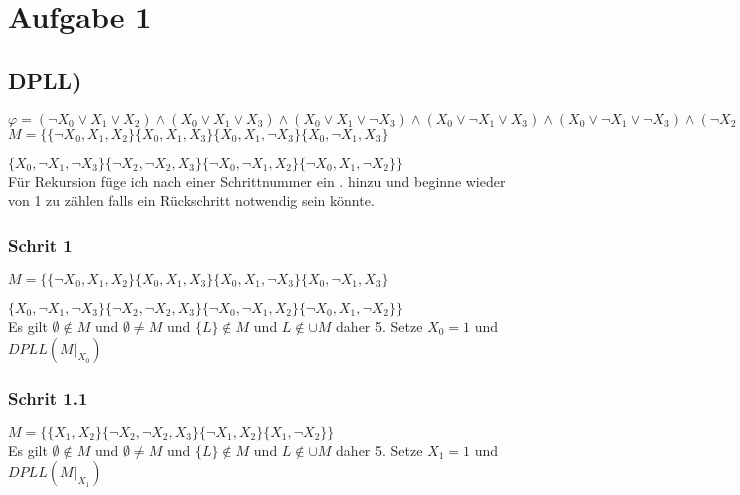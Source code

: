 \section*{Aufgabe 1}

\subsection*{DPLL)}


$\varphi = (\neg X_0 \vee X_1 \vee X_2 ) \wedge
(X_0 \vee X_1 \vee X_3 )
\wedge
(X_0 \vee X_1 \vee \neg X_3 )
\wedge
(X_0 \vee \neg X_1 \vee X_3 )
\wedge
(X_0 \vee \neg X_1 \vee \neg X_3 )
\wedge
(\neg X_2 \vee \neg X_2 \vee X_3 )
\wedge
(\neg X_0 \vee \neg X_1 \vee X_2 )
\wedge
( \neg X_0 \vee X_1 \vee \neg X_2 )
$\\

$M= \{ \{ \neg X_0 , X_1 , X_2 \} 
\{ X_0 , X_1 , X_3 \}
\{ X_0 , X_1 , \neg X_3 \}
\{ X_0 , \neg X_1 , X_3 \}$

$
\{ X_0 , \neg X_1 , \neg X_3 \}
\{ \neg X_2 , \neg X_2 , X_3 \}
\{ \neg X_0 , \neg X_1 , X_2 \}
\{ \neg X_0 , X_1 , \neg X_2 \} \} $\\

Für Rekursion füge ich nach einer Schrittnummer ein $.$ hinzu und beginne wieder von 1 zu zählen falls ein Rückschritt notwendig sein könnte.
\subsubsection*{Schrit 1}
$M= \{ \{ \neg X_0 , X_1 , X_2 \} 
\{ X_0 , X_1 , X_3 \}
\{ X_0 , X_1 , \neg X_3 \}
\{ X_0 , \neg X_1 , X_3 \}$

$
\{ X_0 , \neg X_1 , \neg X_3 \}
\{ \neg X_2 , \neg X_2 , X_3 \}
\{ \neg X_0 , \neg X_1 , X_2 \}
\{ \neg X_0 , X_1 , \neg X_2 \} \} $\\
Es gilt $\emptyset \not \in M$ und $  \emptyset \neq M$ und $\{ L \} \not \in M$ und $ L  \not \in \cup M$ daher 5. Setze $X_0 = 1$ und $DPLL(M\vert_{X_0})$ 

\subsubsection*{Schrit 1.1}
$M= \{ \{ X_1 , X_2 \} 
\{ \neg X_2 , \neg X_2 , X_3 \}
\{ \neg X_1 , X_2 \}
\{ X_1 , \neg X_2 \} \} $\\
Es gilt $\emptyset \not \in M$ und $  \emptyset \neq M$ und $\{ L \} \not \in M$ und $ L  \not \in \cup M$ daher 5. Setze $X_1 = 1$ und $DPLL(M\vert_{X_1})$ 

